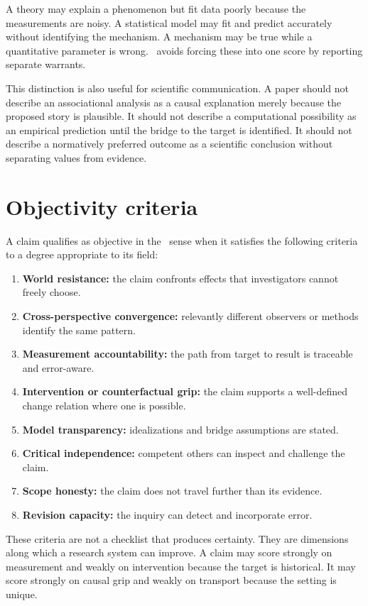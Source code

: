 A theory may explain a phenomenon but fit data poorly because the measurements
are noisy. A statistical model may fit and predict accurately without
identifying the mechanism. A mechanism may be true while a quantitative
parameter is wrong. \RCR\ avoids forcing these into one score by reporting
separate warrants.

This distinction is also useful for scientific communication. A paper should
not describe an associational analysis as a causal explanation merely because
the proposed story is plausible. It should not describe a computational
possibility as an empirical prediction until the bridge to the target is
identified. It should not describe a normatively preferred outcome as a
scientific conclusion without separating values from evidence.

\section{Objectivity criteria}

A claim qualifies as objective in the \RCR\ sense when it satisfies the
following criteria to a degree appropriate to its field:

\begin{enumerate}
\item \textbf{World resistance:} the claim confronts effects that investigators
cannot freely choose.
\item \textbf{Cross-perspective convergence:} relevantly different observers or
methods identify the same pattern.
\item \textbf{Measurement accountability:} the path from target to result is
traceable and error-aware.
\item \textbf{Intervention or counterfactual grip:} the claim supports a
well-defined change relation where one is possible.
\item \textbf{Model transparency:} idealizations and bridge assumptions are
stated.
\item \textbf{Critical independence:} competent others can inspect and challenge
the claim.
\item \textbf{Scope honesty:} the claim does not travel further than its
evidence.
\item \textbf{Revision capacity:} the inquiry can detect and incorporate error.
\end{enumerate}

These criteria are not a checklist that produces certainty. They are dimensions
along which a research system can improve. A claim may score strongly on
measurement and weakly on intervention because the target is historical. It may
score strongly on causal grip and weakly on transport because the setting is
unique.

